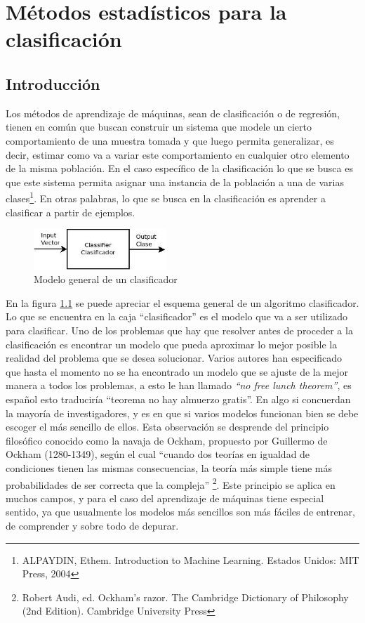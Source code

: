 \documentclass[a4paper, 11pt, oneside]{report}
\begin{document}
\chapter{Métodos estadísticos para la clasificación}
\label{chap:ml}

\section{Introducción}

Los métodos de aprendizaje de máquinas, sean de clasificación o de regresión, tienen en común que buscan construir un sistema que modele un cierto comportamiento de una muestra tomada y que luego permita generalizar, es decir, estimar como va a variar este comportamiento en cualquier otro elemento de la misma población. En el caso específico de la clasificación lo que se busca es que este sistema permita asignar una instancia de la población a una de varias clases\footnote{ALPAYDIN, Ethem. Introduction to Machine Learning. Estados Unidos: MIT Press, 2004}. En otras palabras, lo que se busca en la clasificación es aprender a clasificar a partir de ejemplos.

	\begin{figure}[htb]
	\begin{center}
	\leavevmode
	\includegraphics[width=5cm]{diagrams/classifier1.jpg}
	\end{center}
	\caption{Modelo general de un clasificador}
	\label{fig:classif1}
	\end{figure}

En la figura \ref{fig:classif1} se puede apreciar el esquema general de un algoritmo clasificador. Lo que se encuentra en la caja ``clasificador'' es el modelo que va a ser utilizado para clasificar. Uno de los problemas que hay que resolver antes de proceder a la clasificación es encontrar un modelo que pueda aproximar lo mejor posible la realidad del problema que se desea solucionar. Varios autores han especificado que hasta el momento no se ha encontrado un modelo que se ajuste de la mejor manera a todos los problemas, a esto le han llamado {\it ``no free lunch theorem''}, es español esto traduciría ``teorema no hay almuerzo gratis''. En algo si concuerdan la mayoría de investigadores, y es en que si varios modelos funcionan bien se debe escoger el más sencillo de ellos. Esta observación se desprende del principio filosófico conocido como la navaja de Ockham, propuesto por Guillermo de Ockham (1280-1349), según el cual ``cuando dos teorías en igualdad de condiciones tienen las mismas consecuencias, la teoría más simple tiene más probabilidades de ser correcta que la compleja'' \footnote{Robert Audi, ed. Ockham's razor. The Cambridge Dictionary of Philosophy (2nd Edition). Cambridge University Press}. Este principio se aplica en muchos campos, y para el caso del aprendizaje de máquinas tiene especial sentido, ya que usualmente los modelos más sencillos son más fáciles de entrenar, de comprender y sobre todo de depurar.
\end{document}
